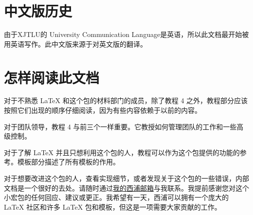 \section{中文版历史}
由于XJTLU的 University Communication Language是英语，所以此文档最开始被用英语写作。此中文版来源于对英文版的翻译。

\section{怎样阅读此文档}
对于不熟悉 \LaTeX{} 和这个包的材料部门的成员，除了教程 4 之外，教程部分应该按照它们出现的顺序仔细阅读，因为有些内容依赖于以前的内容。

对于团队领导，教程 4 与前三个一样重要。它教授如何管理团队的工作和一些高级控制。

对于了解 \LaTeX{} 并且只想利用这个包的人，教程可以作为这个包提供的功能的参考。模板部分描述了所有模板的作用。

对于想要改进这个包的人，查看实现细节，或者发现关于这个包的一些错误，内部文档是一个很好的去处。请随时通过\href{mailto:guanyuming.he20@student.xjtlu.edu.cn}{我的西浦邮箱}与我联系。我提前感谢您对这个小宏包的任何回应、建议或更正。我希望有一天，西浦可以拥有一个庞大的 \LaTeX{} 社区和许多 \LaTeX{} 包和模板，但这是一项需要大家贡献的工作。
